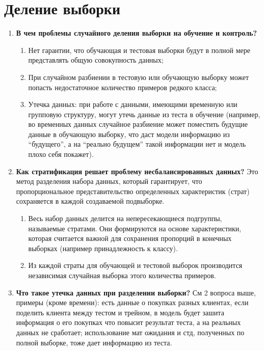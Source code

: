 \documentclass{article}
\begin{document}
\section{Деление выборки}
\begin{enumerate}
    \item \textbf{В чем проблемы случайного деления выборки на обучение и контроль?} 
    \begin{enumerate}
        \item Нет гарантии, что обучающая и тестовая выборки будут в полной мере представлять общую совокупность данных;
        \item При случайном разбиении в тестовую или обучающую выборку может попасть недостаточное количество примеров редкого класса;
        \item Утечка данных: при работе с данными, имеющими временную или групповую структуру, могут утечь данные из теста в обучение (например, во временных данных случайное разбиение может поместить будущие данные в обучающую выборку, что даст модели информацию из ``будущего'', а на ``реально будущем'' такой информации нет и модель плохо себя покажет).
    \end{enumerate}
    \item \textbf{Как стратификация решает проблему несбалансированных данных?} Это метод разделения набора данных, который гарантирует, что пропорциональное представительство определенных характеристик (страт) сохраняется в каждой создаваемой подвыборке. 
    \begin{enumerate}
        \item Весь набор данных делится на непересекающиеся подгруппы, называемые стратами. Они формируются на основе характеристики, которая считается важной для сохранения пропорций в конечных выборках (например принадлежность к классу).
        \item  Из каждой страты для обучающей и тестовой выборок производится независимая случайная выборка этого количества примеров.
    \end{enumerate}
    \item \textbf{Что такое утечка данных при разделении выборки?} См 2 вопроса выше, примеры (кроме времени): есть данные о покупках разных клиентах, если поделить клиента между  тестом и трейном, в модель будет зашита информация о его покупках что повысит результат теста, а на реальных данных не сработает;  использование мат ожидания и стд, полученных по полной выборке, тоже дает информацию из теста.
\end{enumerate}
\end{document}
